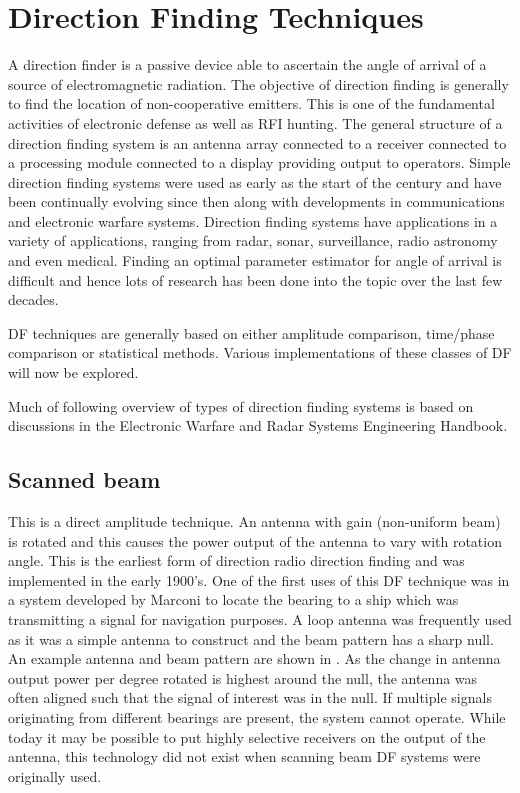 \section{Direction Finding Techniques}
A direction finder is a passive device able to ascertain the angle of arrival of a source of electromagnetic radiation.
The objective of direction finding is generally to find the location of non-cooperative emitters\cite{poisel2012electronic}.
This is one of the fundamental activities of electronic defense as well as RFI hunting.
The general structure of a direction finding system is an antenna array connected to a receiver connected to a processing module connected to a display providing output to operators.
Simple direction finding systems were used as early as the start of the  century and have been continually evolving since then along with developments in communications and electronic warfare systems.
Direction finding systems have applications in a variety of applications, ranging from radar, sonar, surveillance, radio astronomy and even medical. Finding an optimal parameter estimator for angle of arrival is difficult and hence lots of research has been done into the topic over the last few decades\cite{van2004detection}.

DF techniques are generally based on either amplitude comparison, time/phase comparison or statistical methods\cite{tuncer2009classical}. 
Various implementations of these classes of DF will now be explored.

Much of following overview of types of direction finding systems is based on discussions in the Electronic Warfare and Radar Systems Engineering Handbook\cite{center2012electronic}.

\subsection{Scanned beam}
This is a direct amplitude technique. An antenna with gain (non-uniform beam) is rotated and this causes the power output of the antenna to vary with rotation angle. This is the earliest form of direction radio direction finding and was implemented in the early 1900's. 
One of the first uses of this DF technique was in a system developed by Marconi to locate the bearing to a ship which was transmitting a signal for navigation purposes\cite{jenkins1991smallaperture}. A loop antenna was frequently used as it was a simple antenna to construct and the beam pattern has a sharp null. 
An example antenna and beam pattern are shown in . As the change in antenna output power per degree rotated is highest around the null, the antenna was often aligned such that the signal of interest was in the null. 
If multiple signals originating from different bearings are present, the system cannot operate. 
While today it may be possible to put highly selective receivers on the output of the antenna, this technology did not exist when scanning beam DF systems were originally used.

